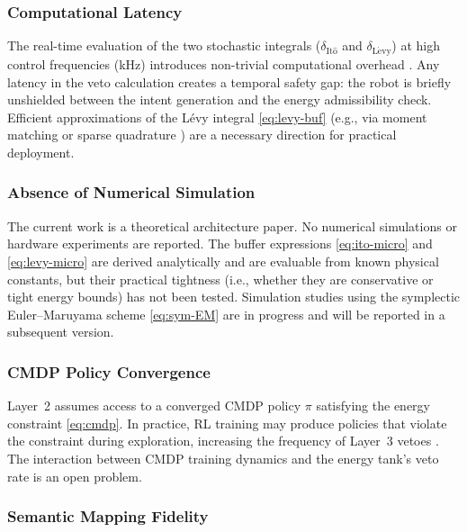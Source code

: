 \documentclass[11pt]{article}
\begin{document}
\subsubsection{Computational Latency}

The real-time evaluation of the two stochastic integrals ($\delta_{\mathrm{It\hat{o}}}$ and
$\delta_{\mathrm{L\acute{e}vy}}$) at high control frequencies (kHz) introduces non-trivial
computational overhead \cite{diehl2009}. Any latency in the veto calculation creates a temporal
safety gap: the robot is briefly unshielded between the intent generation and the energy
admissibility check. Efficient approximations of the L\'{e}vy integral \eqref{eq:levy-buf}
(e.g., via moment matching \cite{cont2006} or sparse quadrature \cite{gerstner1998}) are a
necessary direction for practical deployment.

\subsubsection{Absence of Numerical Simulation}

The current work is a theoretical architecture paper. No numerical simulations or hardware
experiments are reported. The buffer expressions \eqref{eq:ito-micro} and \eqref{eq:levy-micro}
are derived analytically and are evaluable from known physical constants, but their practical
tightness (i.e., whether they are conservative or tight energy bounds) has not been tested.
Simulation studies using the symplectic Euler--Maruyama scheme \eqref{eq:sym-EM} are in
progress and will be reported in a subsequent version.

\subsubsection{CMDP Policy Convergence}

Layer~2 assumes access to a converged CMDP policy $\pi$ satisfying the energy constraint
\eqref{eq:cmdp}. In practice, RL training may produce policies that violate the constraint
during exploration, increasing the frequency of Layer~3 vetoes \cite{garcia2015,achiam2017}.
The interaction between CMDP training dynamics and the energy tank's veto rate is an open
problem.

\subsubsection{Semantic Mapping Fidelity}
\label{sec:sem-limit}
\end{document}
